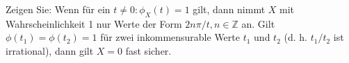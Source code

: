 \begin{exercise}
Zeigen Sie: Wenn für ein $t \neq 0: \phi_X(t) = 1 $ gilt, dann nimmt $X$ mit Wahrscheinlichkeit 1
nur Werte der Form $2n\pi/t, n \in \mathbb{Z}$ an. Gilt $\phi(t_1) = \phi(t_2) = 1$
für zwei inkommensurable Werte $t_1$ und $t_2$ (d. h. $t_1/t_2$ ist irrational),
dann gilt $X = 0$ fast sicher.
\end{exercise}
\begin{solution}
  
\end{solution}

